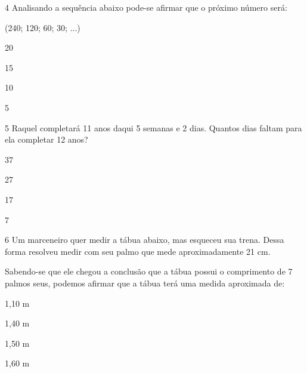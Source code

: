 {\num{4} Analisando a sequência abaixo pode-se afirmar que o próximo número
será:

(240; 120; 60; 30; ...)

\begin{escolha}
\item
  20
\item
  15
\item
  10
\item
  5
\end{escolha}


\num{5} Raquel completará 11 anos daqui 5 semanas e 2 dias. Quantos dias
faltam para ela completar 12 anos?

\begin{escolha}
\item
  37
\item
  27
\item
  17
\item
  7
\end{escolha}


\num{6} Um marceneiro quer medir a tábua abaixo, mas esqueceu sua trena.
Dessa forma resolveu medir com seu palmo que mede aproximadamente 21 cm.


Sabendo-se que ele chegou a conclusão que a tábua possui o comprimento
de 7 palmos seus, podemos afirmar que a tábua terá uma medida aproximada
de:

\begin{escolha}
\item
  1,10 m
\item
  1,40 m
\item
  1,50 m
\item
  1,60 m
\end{escolha}

}
